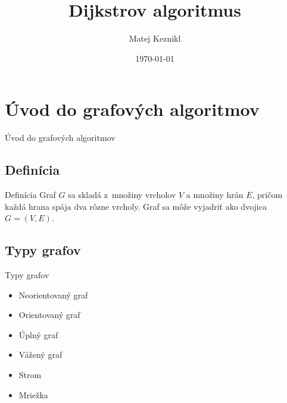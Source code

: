 \documentclass[15pt]{beamer}
\title[Dijkstrov algoritmus]{Dijkstrov algoritmus}
\author{Matej Keznikl}
\institute[VUT FIT]{Fakulta informačních technologií\\Vysoké učení technické v~Brně}
\date{\today}
\begin{document}
\frame{\titlepage}

\section{Úvod do grafových algoritmov}
\begin{frame}{Úvod do grafových algoritmov}
	\subsection{Definícia}
	\begin{block}{Definícia}
		Graf $G$ sa skladá z~množiny vrcholov $V$ a množiny hrán $E$, pričom každá hrana spája dva rôzne vrcholy. Graf sa môže vyjadriť ako dvojica $G = (V,E)$.
	\end{block}
	\subsection{Typy grafov}
	\begin{block}{Typy grafov}
		\begin{itemize}
			\item Neorientovaný graf
			\item Orientovaný graf
			\item Úplný graf
			\item Vážený graf
			\item Strom
			\item Mriežka
		\end{itemize}
	\end{block}
\end{frame}
\end{document}
